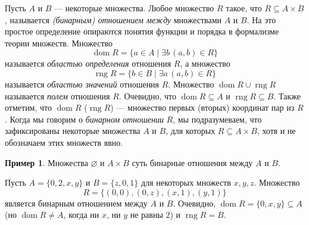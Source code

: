 \documentclass[12pt,notitlepage]{article}
\theoremstyle{plain}
\theoremstyle{definition}
\newtheorem{exm}[thm]{Пример}
\theoremstyle{plain}
\newcommand{\sbs}{\subseteq}
\newcommand{\void}{\varnothing}
\newcommand{\dom}{\mathop{\mathrm{dom}}}
\newcommand{\rng}{\mathop{\mathrm{rng}}}
\newcommand{\1}{\mathbf{1}}
\newcommand{\0}{\mathbf{0}}
\newcommand{\mcomm}[1]{}
\begin{document}
Пусть $A$ и $B$ --- некоторые множества. Любое множество $R$ такое, что $R \sbs A \times B$, называется \emph{(бинарным) отношением между} множествами $A$ и $B$. На это простое определение опираются понятия функции и порядка в формализме теории множеств. Множество
$$\dom R = \{a \in A \mid \exists b\, (a, b) \in R \}$$
называется \emph{областью определения} отношения $R$, а множество
$$\rng R = \{b \in B \mid \exists a\, (a, b) \in R \}$$
называется \emph{областью значений} отношения $R$. Множество $\dom R \cup \rng R$ называется \emph{полем} отношения $R$. Очевидно, что $\dom R \sbs A$ и $\rng R \sbs B$. Также отметим, что $\dom R$ ($\rng R$) --- множество первых (вторых) координат пар из $R$. Когда мы говорим о \emph{бинарном отношении} $R$, мы подразумеваем, что зафиксированы некоторые множества $A$ и $B$, для которых $R \sbs A \times B$, хотя и не обозначаем этих множеств явно.

\mcomm{We prefer this `parametric' definition to the more natural one (where every set $R$ of ordered pairs is called a relation) since the latter would require taking ${\cup} {\cup} R$ for the relation's field, whereas we want to avoid infinite unions generally.}

\begin{exm}\label{rel:exm_rel}
	Множества $\void$ и $A \times B$ суть бинарные отношения между $A$ и $B$.
	
	Пусть $A = \{0,2, x, y\}$ и $B = \{z, 0, 1\}$ для некоторых множеств $x, y, z$. Множество
	$$R = \{ (0, 0), (0,z), (x, 1), (y,1) \}$$
	является бинарным отношением между $A$ и $B$. Очевидно, $\dom R = \{0,x,y\} \sbs A$ (но $\dom R \neq A$, когда ни $x$, ни $y$ не равны $2$) и $\rng R = B$.
\end{exm}
\end{document}
